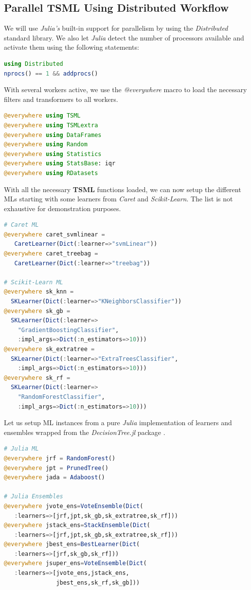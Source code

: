 \documentclass{juliacon}
\begin{document}
\subsection{Parallel TSML Using Distributed Workflow}

We will use \emph{Julia's} built-in support for parallelism by using the \emph{Distributed} standard library. We also let \emph{Julia} detect the number of processors available and activate them using the following statements:

\begin{lstlisting}[language = Julia]
using Distributed 
nprocs() == 1 && addprocs()
\end{lstlisting}

With several workers active, we use the \emph{@everywhere} macro to load the necessary filters and transformers to all workers.

\begin{lstlisting}[language = Julia]
@everywhere using TSML
@everywhere using TSMLextra
@everywhere using DataFrames
@everywhere using Random
@everywhere using Statistics
@everywhere using StatsBase: iqr
@everywhere using RDatasets
\end{lstlisting}

With all the necessary \textbf{TSML} functions loaded, we can now setup the different MLs starting with some learners from \emph{Caret} and \emph{Scikit-Learn}. The list is not exhaustive for demonstration purposes.

\begin{lstlisting}[language = Julia]
# Caret ML
@everywhere caret_svmlinear = 
   CaretLearner(Dict(:learner=>"svmLinear"))
@everywhere caret_treebag = 
   CaretLearner(Dict(:learner=>"treebag"))

# Scikit-Learn ML
@everywhere sk_knn = 
  SKLearner(Dict(:learner=>"KNeighborsClassifier"))
@everywhere sk_gb = 
  SKLearner(Dict(:learner=>
    "GradientBoostingClassifier",
    :impl_args=>Dict(:n_estimators=>10)))
@everywhere sk_extratree = 
  SKLearner(Dict(:learner=>"ExtraTreesClassifier",
    :impl_args=>Dict(:n_estimators=>10)))
@everywhere sk_rf = 
  SKLearner(Dict(:learner=>
    "RandomForestClassifier",
    :impl_args=>Dict(:n_estimators=>10)))
\end{lstlisting}

Let us setup ML instances from a pure \emph{Julia} implementation of learners and ensembles wrapped from the \emph{DecisionTree.jl} package \cite{decisiontree2008}.

\begin{lstlisting}[language = Julia]
# Julia ML
@everywhere jrf = RandomForest()
@everywhere jpt = PrunedTree()
@everywhere jada = Adaboost()

# Julia Ensembles
@everywhere jvote_ens=VoteEnsemble(Dict(
   :learners=>[jrf,jpt,sk_gb,sk_extratree,sk_rf]))
@everywhere jstack_ens=StackEnsemble(Dict(
   :learners=>[jrf,jpt,sk_gb,sk_extratree,sk_rf]))
@everywhere jbest_ens=BestLearner(Dict(
   :learners=>[jrf,sk_gb,sk_rf]))
@everywhere jsuper_ens=VoteEnsemble(Dict(
   :learners=>[jvote_ens,jstack_ens,
               jbest_ens,sk_rf,sk_gb]))
\end{lstlisting}
\end{document}
